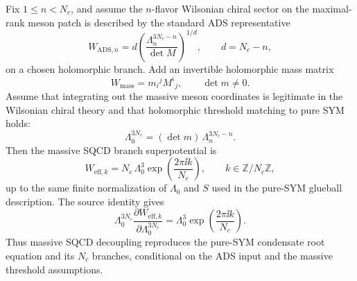 \begin{proposition}
\label{prop:massive-sqcd-to-pure-sym-condensate-branches}
Fix \(1\leq n<N_c\), and assume the \(n\)-flavor Wilsonian chiral sector on
the maximal-rank meson patch is described by the standard ADS representative
\begin{equation}
  W_{\mathrm{ADS},n}
  =
  d\left(
    \frac{\Lambda_n^{3N_c-n}}{\det M}
  \right)^{1/d},
  \qquad d=N_c-n,
  \label{eq:massive-sqcd-ads-standard-representative}
\end{equation}
on a chosen holomorphic branch.  Add an invertible holomorphic mass matrix
\begin{equation}
  W_{\mathrm{mass}}=m_i{}^j M^i{}_j,
  \qquad \det m\neq0 .
  \label{eq:massive-sqcd-mass-matrix}
\end{equation}
Assume that integrating out the massive meson coordinates is legitimate in
the Wilsonian chiral theory and that holomorphic threshold matching to pure
SYM holds:
\begin{equation}
  \Lambda_0^{3N_c}
  =
  (\det m)\,\Lambda_n^{3N_c-n}.
  \label{eq:massive-sqcd-pure-scale-matching}
\end{equation}
Then the massive SQCD branch superpotential is
\begin{equation}
  W_{\mathrm{eff},k}
  =
  N_c\,\Lambda_0^3
  \exp\!\left(\frac{2\pi\ii k}{N_c}\right),
  \qquad k\in\mathbb Z/N_c\mathbb Z,
  \label{eq:massive-sqcd-pure-branch-superpotential}
\end{equation}
up to the same finite normalization of \(\Lambda_0\) and \(S\) used in the
pure-SYM glueball description.  The source identity gives
\begin{equation}
  \Lambda_0^{3N_c}
  \frac{\partial W_{\mathrm{eff},k}}
       {\partial \Lambda_0^{3N_c}}
  =
  \Lambda_0^3
  \exp\!\left(\frac{2\pi\ii k}{N_c}\right).
  \label{eq:massive-sqcd-pure-source-identity}
\end{equation}
Thus massive SQCD decoupling reproduces the pure-SYM condensate root
equation and its \(N_c\) branches, conditional on the ADS input and the
massive threshold assumptions.
\end{proposition}

